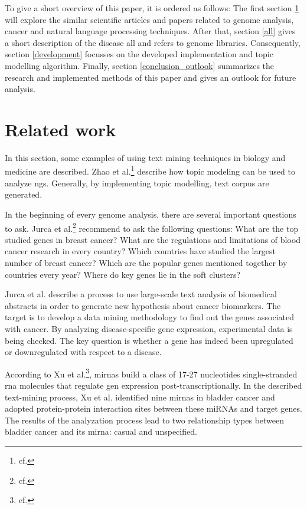 To give a short overview of this paper, it is ordered as follows: The first section \ref{related} will explore the similar scientific articles and papers related to genome analysis, cancer and natural language processing techniques. After that, section \ref{all} gives a short description of the disease \ac{all} and refers to genome libraries. Consequently, section \ref{development} focusses on the developed implementation and topic modelling algorithm. Finally, section \ref{conclusion_outlook} summarizes the research and implemented methods of this paper and gives an outlook for future analysis.

\chapter{Related work}\label{related}

In this section, some examples of using text mining techniques in biology and medicine are described.
Zhao et al.\footnote{cf.\autocite{zhao_2016}} describe how topic modeling can be used to analyze \ac{ngs}. Generally, by implementing topic modelling, text corpus are generated.

In the beginning of every genome analysis, there are several important questions to ask. Jurca et al.\footnote{cf.\autocite{jurca_2016}} recommend to ask the following questions: What are the top studied genes in breast cancer? What are the regulations and limitations of blood cancer research in every country? Which countries have studied the largest number of breast cancer? Which are the popular genes mentioned together by countries every year? Where do key genes lie in the soft clusters?

Jurca et al. describe a process to use large-scale text analysis of biomedical abstracts in order to generate new hypothesis about cancer biomarkers. The target is to develop a data mining methodology to find out the genes associated with cancer. By analyzing disease-specific gene expression, experimental data is being checked. The key question is whether a gene has indeed been upregulated or downregulated with respect to a disease.

According to Xu et al.\footnote{cf.\autocite{xu_2013}}, \ac{mirna}s build a class of 17-27 nucleotides single-stranded \ac{rna} molecules that regulate gen expression post-transcriptionally. In the described text-mining process, Xu et al. identified nine \ac{mirna}s in bladder cancer and adopted protein-protein interaction sites between these miRNAs and target genes. The results of the analyzation process lead to two relationship types between bladder cancer and its \ac{mirna}: casual and unspecified. 

